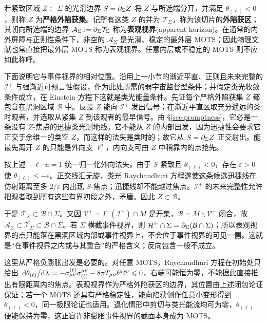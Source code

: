 若紧致区域 $Z\subset\Sigma$ 的光滑边界 $S=\partial_\Sigma Z$ 将 $Z$ 与所选端分开，并满足 $\theta_{(\ell)}<0$，则称 $Z$ 为\textbf{严格外陷获集}。记所有这类 $Z$ 的并为 $\mathcal T_\Sigma$，称为该切片的\textbf{外陷获区}；其朝向所选端的边界 $\mathcal A_\Sigma:=\partial_\Sigma\mathcal T_\Sigma$ 称为\textbf{表观视界}(apparent horizon)。在通常的内外屏障与正则性条件下，非空的 $\mathcal A_\Sigma$ 是光滑、稳定的最外层 MOTS；因此物理文献也常直接把最外层 MOTS 称为表观视界。任意内层或不稳定的 MOTS 则不应如此称呼。

下面说明它与事件视界的相对位置。沿用上一小节的渐近平直、正则且未来完整的 $\mathscr I^+$ 与强渐近可预言性假设，作为此处所需的弱宇宙监督型条件；并假定类光收敛条件成立，在 Einstein 方程下这就是类光能量条件。先证每个严格外陷获集 $Z$ 都包含在黑洞区域 $\mathcal B$ 中。反设 $Z$ 能向 $\mathscr I^+$ 发出信号；在渐近平直区取充分遥远的类时观者，并选取从紧集 $Z$ 到该观者的最早信号。由 \S\ref{sec:promptness}，它必是一条没有 $Z$-焦点的迅捷类光测地线。它不能从 $Z$ 的内部出发，因为迅捷性会要求它正交于余维一的类空 $Z$，而这样的法矢是类时的；故它从 $S=\partial_\Sigma Z$ 正交射出。能最先离开 $Z$ 的只能是外向支 $\ell^\mu$，内向支可由 $Z$ 中稍靠内的点抢先。

按上述 $-\ell\cdot u=1$ 统一归一化外向法矢。由于 $S$ 紧致且 $\theta_{(\ell)}<0$，存在 $\varepsilon>0$ 使 $\theta_{(\ell)}\leqslant-\varepsilon$。正交线汇无旋，类光 Raychaudhuri 方程遂使这条候选迅捷线在仿射距离至多 $2/\varepsilon$ 内出现 $S$-焦点；迅捷线却不能越过焦点。$\mathscr I^+$ 的未来完整性允许把观者取到所有这些有界初段之外，矛盾。因此 $Z\subset\mathcal B$。

于是 $\mathcal T_\Sigma\subset\mathcal B\cap\Sigma$。又因 $\mathcal V^+=I^-(\mathscr I^+)\cap M$ 是开集，$\mathcal B=M\backslash\mathcal V^+$ 闭合，故 $\mathcal A_\Sigma\subset\overline{\mathcal T_\Sigma}\subset\mathcal B\cap\Sigma$。若 $\Sigma$ 横截事件视界，则 $\mathcal H^+\cap\Sigma=\partial_\Sigma(\mathcal B\cap\Sigma)$；所以表观视界的点只能落在黑洞区域内部或事件视界上，不会位于事件视界的可见一侧。这就是“在事件视界之内或与其重合”的严格含义；反向包含一般不成立。

这里从严格负膨胀出发是必要的。对任意 MOTS，Raychaudhuri 方程在初始处只给出 $\dv*{\theta_{(\ell)}}{\lambda}=-\sigma_{\mu\nu}^{(\ell)}\sigma_{(\ell)}^{\mu\nu}-8\pi T_{\mu\nu}\ell^\mu\ell^\nu\leqslant0$，右端可能恒为零，不能据此直接推出有限距离内的焦点。表观视界作为严格外陷获区的边界，其位置由上述闭包论证保证；若一个 MOTS 还具有严格稳定性，能向陷获侧作任意小变形得到 $\theta_{(\ell)}<0$，同一极限论证也适用。退化情形中剪切与类光能流均可为零，$\theta_{(\ell)}$ 便能保持为零，这正容许非膨胀事件视界的截面本身成为 MOTS。

